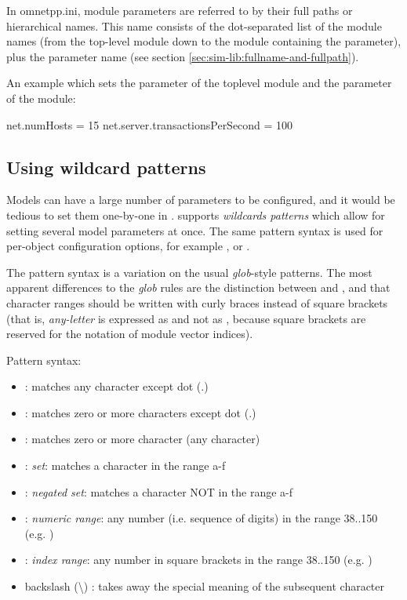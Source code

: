 In omnetpp.ini, module parameters are referred to by their full paths
or hierarchical names. This name consists of the dot-separated list of
the module names (from the top-level module down to the module containing
the parameter), plus the parameter name
(see section \ref{sec:sim-lib:fullname-and-fullpath}).

An example  which sets the  parameter of
the toplevel module and the  parameter of the
 module:

\begin{inifile}
[General]
net.numHosts = 15
net.server.transactionsPerSecond = 100
\end{inifile}


\subsection{Using wildcard patterns}
\label{sec:ch-config-sim:wildcards}

Models can have a large number of parameters to be configured, and it would
be tedious to set them one-by-one in . {\opp} supports
\textit{wildcards patterns} which allow for setting several model parameters
at once. The same pattern syntax is used for per-object configuration options,
for example , or .

The pattern syntax is a variation on the usual \textit{glob}-style
patterns. The most apparent differences to the \textit{glob} rules are the
distinction between \ttt{*} and \ttt{**}, and that character ranges should
be written with curly braces instead of square brackets (that is,
\textit{any-letter} is expressed as  and not as
\ttt{[a-zA-Z]}, because square brackets are reserved for the notation of
module vector indices).

Pattern syntax:

\begin{itemize}
  \item {} : matches any character except dot (.)
  \item \ttt{*} : matches zero or more characters except dot (.)
  \item \ttt{**} : matches zero or more character (any character)
  \item {} : \textit{set}: matches a character in the range a-f
  \item {}: \textit{negated set}: matches a character
    NOT in the range a-f
  \item {} : \textit{numeric range}: any number (i.e. sequence of digits)
    in the range 38..150  (e.g. )
  \item \ttt{[38..150]} : \textit{index range}: any number in square brackets in the
    range 38..150 (e.g. \ttt{[99]})
  \item backslash ({\textbackslash}) : takes away the special meaning of the
    subsequent character
\end{itemize}

